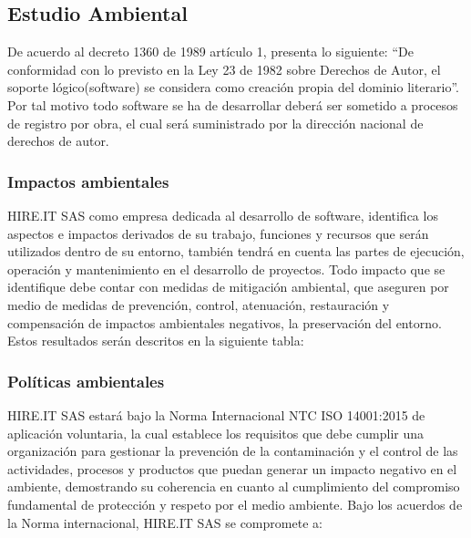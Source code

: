 \subsection{Estudio Ambiental}

De acuerdo al decreto 1360 de 1989 artículo 1, presenta lo siguiente: “De conformidad con lo previsto en la Ley 23 de 1982 sobre Derechos de Autor, el soporte lógico(software) se considera como creación propia del dominio literario”. Por tal motivo todo software se ha de desarrollar deberá ser sometido a procesos de registro por obra, el cual será suministrado por la dirección nacional de derechos de autor.

\subsubsection*{Impactos ambientales}
HIRE.IT SAS como empresa dedicada al desarrollo de software, identifica los aspectos e impactos derivados de su trabajo, funciones y recursos que serán utilizados dentro de su entorno, también tendrá en cuenta las partes de ejecución, operación y mantenimiento en el desarrollo de proyectos. Todo impacto que se identifique debe contar con medidas de mitigación ambiental, que aseguren por medio de medidas de prevención, control, atenuación, restauración y compensación de impactos ambientales negativos, la preservación del entorno. Estos resultados serán descritos en la siguiente tabla:


\subsubsection*{Políticas ambientales}

HIRE.IT SAS estará bajo la Norma Internacional NTC ISO 14001:2015 de aplicación voluntaria, la cual establece los requisitos que debe cumplir una organización para gestionar la prevención de la contaminación y el control de las actividades, procesos y productos que puedan generar un impacto negativo en el ambiente, demostrando su coherencia en cuanto al cumplimiento del compromiso fundamental de protección y respeto por el medio ambiente. Bajo los acuerdos de la Norma internacional, HIRE.IT SAS se compromete a:

